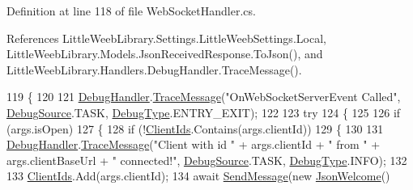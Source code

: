 Definition at line 118 of file Web\+Socket\+Handler.\+cs.



References Little\+Weeb\+Library.\+Settings.\+Little\+Weeb\+Settings.\+Local, Little\+Weeb\+Library.\+Models.\+Json\+Received\+Response.\+To\+Json(), and Little\+Weeb\+Library.\+Handlers.\+Debug\+Handler.\+Trace\+Message().


\begin{DoxyCode}
119         \{
120 
121             \mbox{\hyperlink{class_little_weeb_library_1_1_handlers_1_1_web_socket_handler_aa1474285fe938f284633c31403bf9edf}{DebugHandler}}.\mbox{\hyperlink{interface_little_weeb_library_1_1_handlers_1_1_i_debug_handler_a2e405bc3492e683cd3702fae125221bc}{TraceMessage}}(\textcolor{stringliteral}{"OnWebSocketServerEvent Called"}, 
      \mbox{\hyperlink{namespace_little_weeb_library_1_1_handlers_a2a6ca0775121c9c503d58aa254d292be}{DebugSource}}.TASK, \mbox{\hyperlink{namespace_little_weeb_library_1_1_handlers_ab66019ed40462876ec4e61bb3ccb0a62}{DebugType}}.ENTRY\_EXIT);
122 
123             \textcolor{keywordflow}{try}
124             \{
125 
126                 \textcolor{keywordflow}{if} (args.isOpen)
127                 \{
128                     \textcolor{keywordflow}{if} (!\mbox{\hyperlink{class_little_weeb_library_1_1_handlers_1_1_web_socket_handler_a019d083f8ea9b7ad625222d2311c5b26}{ClientIds}}.Contains(args.clientId))
129                     \{
130 
131                         \mbox{\hyperlink{class_little_weeb_library_1_1_handlers_1_1_web_socket_handler_aa1474285fe938f284633c31403bf9edf}{DebugHandler}}.\mbox{\hyperlink{interface_little_weeb_library_1_1_handlers_1_1_i_debug_handler_a2e405bc3492e683cd3702fae125221bc}{TraceMessage}}(\textcolor{stringliteral}{"Client with id "} + args.clientId
       + \textcolor{stringliteral}{" from "} + args.clientBaseUrl + \textcolor{stringliteral}{" connected!"}, \mbox{\hyperlink{namespace_little_weeb_library_1_1_handlers_a2a6ca0775121c9c503d58aa254d292be}{DebugSource}}.TASK, 
      \mbox{\hyperlink{namespace_little_weeb_library_1_1_handlers_ab66019ed40462876ec4e61bb3ccb0a62}{DebugType}}.INFO);
132 
133                         \mbox{\hyperlink{class_little_weeb_library_1_1_handlers_1_1_web_socket_handler_a019d083f8ea9b7ad625222d2311c5b26}{ClientIds}}.Add(args.clientId);
134                         await \mbox{\hyperlink{class_little_weeb_library_1_1_handlers_1_1_web_socket_handler_a1de289d54d665a32c93478c68d3e6ad0}{SendMessage}}(\textcolor{keyword}{new} \mbox{\hyperlink{class_little_weeb_library_1_1_models_1_1_json_welcome}{JsonWelcome}}()

\end{DoxyCode}

